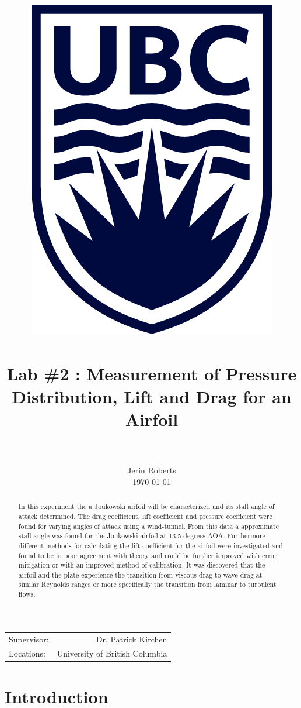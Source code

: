 \documentclass[paper=a4, fontsize=11pt, abstract=on]{scrartcl}
\title{
		\usefont{OT1}{bch}{b}{n}
		\normalfont \normalsize \textsc{} \\ [25pt]
		\includegraphics[width=0.3\linewidth]{ubc.png} \\
		\horrule{0.5pt} \\[0.2cm]
		\huge Lab \#2 : Measurement of Pressure Distribution, Lift and Drag for an Airfoil \\
		\horrule{2pt} \\[0.005cm]
}
\author{
		\normalfont 								\normalsize
        Jerin Roberts\\[-5pt]		\normalsize
        \today
}
\date{}
\numberwithin{equation}{section}		%
\numberwithin{figure}{section}			%
\numberwithin{table}{section}				%
\begin{document}
\maketitle
\begin{center}
\begin{tabular}{l r}


Supervisor: & Dr. Patrick Kirchen  \\ %
Locations: & University of British Columbia


\end{tabular}
\end{center}
\newpage
\begin{abstract}
 In this experiment the a Joukowski airfoil will be characterized and its stall angle of attack determined. The drag coefficient, lift coefficient and pressure coefficient were found for varying angles of attack using a wind-tunnel. From this data a approximate stall angle was found for the Joukowski airfoil at 13.5 degrees AOA. Furthermore different methods for calculating the lift coefficient for the airfoil were investigated and found to be in poor agreement with theory and could be further improved with error mitigation or with an improved method of calibration. It was discovered that the airfoil and the plate experience the transition from viscous drag to wave drag at similar Reynolds ranges or more specifically the transition from laminar to turbulent flows.
\end{abstract}


\newpage
\tableofcontents
\listoffigures
\listoftables
\newpage
\lstset{language=[Visual]C++}

\mbox{}%

 
 
\printnomenclature

\newpage
\section{Introduction}
\end{document}
